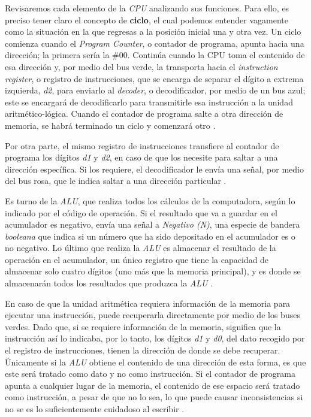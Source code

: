 \documentclass[letterpaper,12pt,oneside]{book}
\begin{document}
	Revisaremos cada elemento de la \textit{CPU} analizando sus funciones. Para ello,
	es preciso tener claro el concepto de \textbf{ciclo}, el cual podemos entender vagamente 
	como la situación en la que regresas a la posición inicial una y otra vez. Un ciclo comienza
	cuando el \textit{Program Counter}, o contador de programa, apunta hacia una dirección;
	la primera sería la \#00. Continúa
	cuando la CPU toma el contenido de esa dirección y, por medio del bus verde, la transporta hacia el 
	\textit{instruction register}, o registro de instrucciones, que se encarga de separar el dígito a extrema izquierda, \textit{d2},
	para enviarlo al  \textit{decoder}, o decodificador,
	por medio de un bus azul; este se encargará de decodificarlo
	para transmitirle esa instrucción a la 
	unidad aritmético-lógica. Cuando el contador de programa salte a otra dirección de memoria, 
	se habrá terminado un ciclo y
	comenzará otro \cite{fingerman_instruction_1968}. 
 
    Por otra parte, el mismo registro de instrucciones transfiere al contador de programa 
	los dígitos \textit{d1} y \textit{d2},
	en caso de que los necesite para saltar a una dirección específica. Si los requiere, el decodificador 
	le envía una señal, por medio 
	del bus rosa, que le indica saltar a una dirección particular \cite{fingerman_instruction_1968}.
	
	Es turno de la \textit{ALU}, que realiza todos los cálculos de la computadora, según lo indicado por el código de operación.
	Si el resultado que va a guardar
	en el acumulador es negativo, envía una señal a \textit{Negativo (N)},
	una especie de bandera \textit{booleana} que indica si un número 
	que ha sido depositado en el acumulador es
	o no negativo. Lo último que realiza la \textit{ALU} es almacenar el resultado de la operación
	en el  acumulador, un único registro
	que tiene la capacidad de almacenar solo cuatro dígitos (uno más que la memoria principal), 
	y es donde se almacenarán todos
	los resultados que produzca la \textit{ALU} \cite{fingerman_instruction_1968}. 
	
	En caso de que la unidad aritmética requiera información
	de la memoria  para ejecutar una instrucción,
	puede recuperarla directamente por medio de los buses verdes. Dado que, si se requiere información
	de la memoria, significa que la instrucción así lo indicaba,
	por lo tanto, los dígitos \textit{d1} y \textit{d0}, del dato recogido por el registro
	de instrucciones,
	tienen la dirección de donde se debe recuperar.  Únicamente
	si la \textit{ALU} obtiene el contenido de una dirección de esta forma, es que este
	será tratado como dato y no como instrucción. Si el contador de programa apunta a cualquier
	lugar de la memoria, el contenido de ese espacio será tratado como instrucción, a pesar
	de que no lo sea, lo que puede causar inconsistencias si no se es lo suficientemente
	 cuidadoso al escribir \cite{fingerman_instruction_1968}.
	
\end{document}
